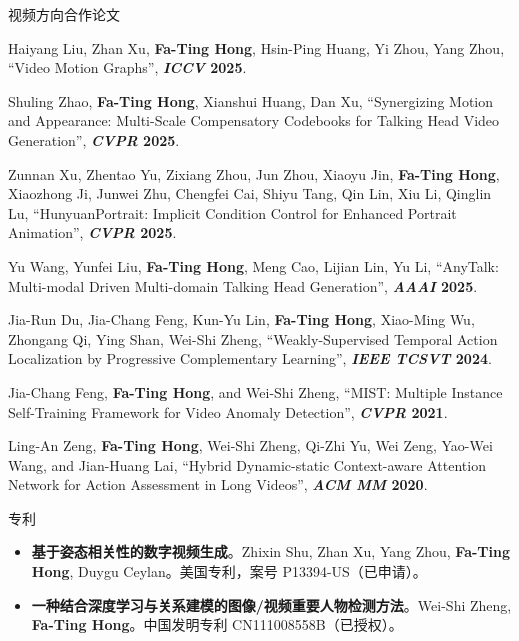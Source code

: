\documentclass{resume}
\newcommand{\pubtopic}[2]{\par\needspace{3\baselineskip}\vspace{2pt}\noindent\hspace{8pt}{\color{#1}\rule[-1pt]{2.5pt}{9pt}}\hspace{5pt}{\small\bfseries\color{#1}#2}\par\vspace{1pt}}
\begin{document}
\begin{rSection}{视频方向合作论文}
\pubtopic{topicVG}{以人为中心的视频与视觉理解 / 生成}
\begin{enumerate}[label={\color{topicVG}[C\arabic*]}, start=1, leftmargin=26pt, labelsep=5pt, itemsep=0pt, parsep=0pt, topsep=0pt]
    \item Haiyang Liu, Zhan Xu, \textbf{Fa-Ting Hong}, Hsin-Ping Huang, Yi Zhou, Yang Zhou,
    ``Video Motion Graphs'', \textbf{\textit{ICCV} 2025}.

    \item Shuling Zhao, \textbf{Fa-Ting Hong}, Xianshui Huang, Dan Xu,
    ``Synergizing Motion and Appearance: Multi-Scale Compensatory Codebooks for Talking Head Video Generation'', \textbf{\textit{CVPR} 2025}.

    \item Zunnan Xu, Zhentao Yu, Zixiang Zhou, Jun Zhou, Xiaoyu Jin, \textbf{Fa-Ting Hong}, Xiaozhong Ji, Junwei Zhu, Chengfei Cai, Shiyu Tang, Qin Lin, Xiu Li, Qinglin Lu,
    ``HunyuanPortrait: Implicit Condition Control for Enhanced Portrait Animation'', \textbf{\textit{CVPR} 2025}.

    \item Yu Wang, Yunfei Liu, \textbf{Fa-Ting Hong}, Meng Cao, Lijian Lin, Yu Li,
    ``AnyTalk: Multi-modal Driven Multi-domain Talking Head Generation'', \textbf{\textit{AAAI} 2025}.

    \item Jia-Run Du, Jia-Chang Feng, Kun-Yu Lin, \textbf{Fa-Ting Hong}, Xiao-Ming Wu, Zhongang Qi, Ying Shan, Wei-Shi Zheng,
    ``Weakly-Supervised Temporal Action Localization by Progressive Complementary Learning'', \textbf{\textit{IEEE TCSVT} 2024}.

    \item Jia-Chang Feng, \textbf{Fa-Ting Hong}, and Wei-Shi Zheng,
    ``MIST: Multiple Instance Self-Training Framework for Video Anomaly Detection'', \textbf{\textit{CVPR} 2021}.

    \item Ling-An Zeng, \textbf{Fa-Ting Hong}, Wei-Shi Zheng, Qi-Zhi Yu, Wei Zeng, Yao-Wei Wang, and Jian-Huang Lai,
    ``Hybrid Dynamic-static Context-aware Attention Network for Action Assessment in Long Videos'', \textbf{\textit{ACM MM} 2020}.

\end{enumerate}
\end{rSection}

\begin{rSection}{专利}

\begin{itemize}[leftmargin=18pt]
\setlength{\itemsep}{-2pt}
    \item \textbf{基于姿态相关性的数字视频生成}。Zhixin Shu, Zhan Xu, Yang Zhou, \textbf{\mbox{Fa-Ting} Hong}, Duygu Ceylan。美国专利，案号 P13394-US（已申请）。
    \item \textbf{一种结合深度学习与关系建模的图像/视频重要人物检测方法}。Wei-Shi Zheng, \textbf{Fa-Ting Hong}。中国发明专利 CN111008558B（已授权）。
\end{itemize}

\end{rSection}
\end{document}
